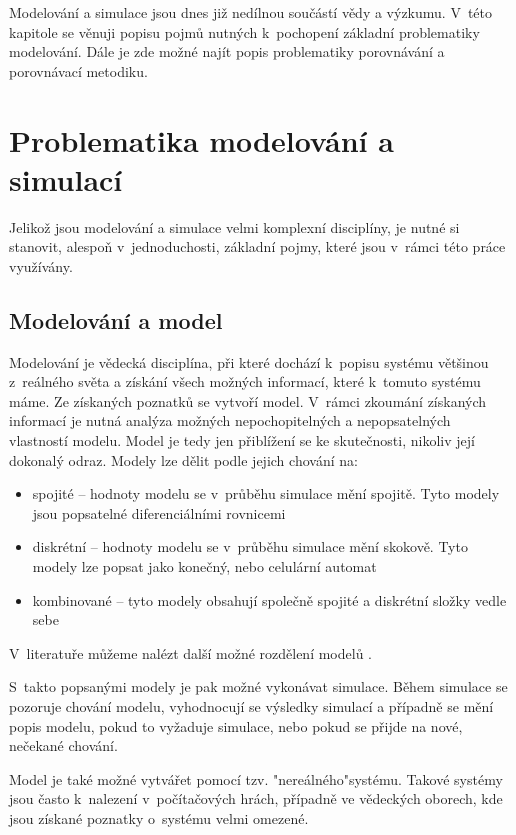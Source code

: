 Modelování a simulace jsou dnes již nedílnou součástí vědy a výzkumu. V~této kapitole se věnuji popisu pojmů nutných k~pochopení základní problematiky modelování. Dále je zde možné najít popis problematiky porovnávání a porovnávací metodiku.

\section{Problematika modelování a simulací}
Jelikož jsou modelování a simulace velmi komplexní disciplíny, je nutné si stanovit, alespoň v~jednoduchosti, základní pojmy, které jsou v~rámci této práce využívány.

\subsection{Modelování a model}
\label{modelovani}
Modelování je vědecká disciplína, při které dochází k~popisu systému většinou z~reálného světa a získání všech možných informací, které k~tomuto systému máme. Ze získaných poznatků se vytvoří model. V~rámci zkoumání získaných informací je nutná analýza možných nepochopitelných a nepopsatelných vlastností modelu. Model je tedy jen přiblížení se ke skutečnosti, nikoliv její dokonalý odraz. Modely lze dělit podle jejich chování na:

\begin{itemize}
    \item spojité -- hodnoty modelu se v~průběhu simulace mění spojitě. Tyto modely jsou popsatelné diferenciálními rovnicemi
    \item diskrétní -- hodnoty modelu se v~průběhu simulace mění skokově. Tyto modely lze popsat jako konečný, nebo celulární automat
    \item kombinované -- tyto modely obsahují společně spojité a diskrétní složky vedle sebe
\end{itemize}

V~literatuře můžeme nalézt další možné rozdělení modelů \cite{IMS-skripta}.
\newline

S~takto popsanými modely je pak možné vykonávat simulace. Během simulace se pozoruje chování modelu, vyhodnocují se výsledky simulací a případně se mění popis modelu, pokud to vyžaduje simulace, nebo pokud se přijde na nové, nečekané chování.

Model je také možné vytvářet pomocí tzv. "nereálného"\space systému. Takové systémy jsou často k~nalezení v~počítačových hrách, případně ve vědeckých oborech, kde jsou získané poznatky o~systému velmi omezené.

